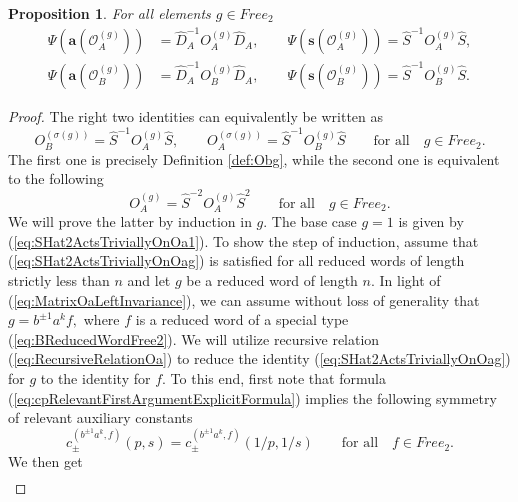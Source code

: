 \documentclass{amsart}
\newtheorem{proposition}[theorem]{Proposition}
\newcommand{\Oa}{\mathcal O_A}
\newcommand{\Ob}{\mathcal O_B}
\begin{document}
\begin{proposition}
For all elements $g\in Free_2$
\begin{subequations}
\begin{align}
\Psi(\mathbf a(\Oa^{(g)}))&=\widehat D_A^{-1}O_A^{(g)}\widehat D_A,\qquad \Psi(\mathbf s(\Oa^{(g)}))=\widehat S^{-1} O_A^{(g)}\widehat S,\\
\Psi(\mathbf a(\Ob^{(g)}))&=\widehat D_A^{-1}O_B^{(g)}\widehat D_A,\qquad \Psi(\mathbf s(\Ob^{(g)}))=\widehat S^{-1}O_B^{(g)}\widehat S.
\end{align}
\label{eq:PsiEquivariance}
\end{subequations}
\label{prop:MCGEquivariancePsi}
\end{proposition}
\begin{proof}
The right two identities can equivalently be written as
\begin{equation}
O_B^{(\sigma(g))}=\widehat S^{-1}O_A^{(g)}\widehat S,\qquad O_A^{(\sigma(g))}=\widehat S^{-1}O_B^{(g)}\widehat S\qquad\textrm{for all}\quad g\in Free_2.
\label{eq:SHatConjugationFlipsAB}
\end{equation}
The first one is precisely Definition \ref{def:Obg}, while the second one is equivalent to the following
\begin{equation}
O_A^{(g)}=\widehat S^{-2}O_A^{(g)}\widehat S^2\qquad\textrm{for all}\quad g\in Free_2.
\label{eq:SHat2ActsTriviallyOnOag}
\end{equation}
We will prove the latter by induction in $g$. The base case $g=1$ is given by (\ref{eq:SHat2ActsTriviallyOnOa1}). To show the step of induction, assume that (\ref{eq:SHat2ActsTriviallyOnOag}) is satisfied for all reduced words of length strictly less than $n$ and let $g$ be a reduced word of length $n$. In light of (\ref{eq:MatrixOaLeftInvariance}), we can assume without loss of generality that $g=b^{\pm1}a^kf,$ where $f$ is a reduced word of a special type (\ref{eq:BReducedWordFree2}). We will utilize recursive relation (\ref{eq:RecursiveRelationOa}) to reduce the identity (\ref{eq:SHat2ActsTriviallyOnOag}) for $g$ to the identity for $f$. To this end, first note that formula (\ref{eq:cpRelevantFirstArgumentExplicitFormula}) implies the following symmetry of relevant auxiliary constants
\begin{equation}
c_{\pm}^{(b^{\pm1}a^k,f)}(p,s)=c_{\pm}^{(b^{\pm1}a^k,f)}(1/p,1/s)\qquad\textrm{for all}\quad f\in Free_2.
\label{eq:cpcmZ2Symmetry}
\end{equation}
We then get
\begin{align*}

\end{align*}
\end{proof}
\end{document}
